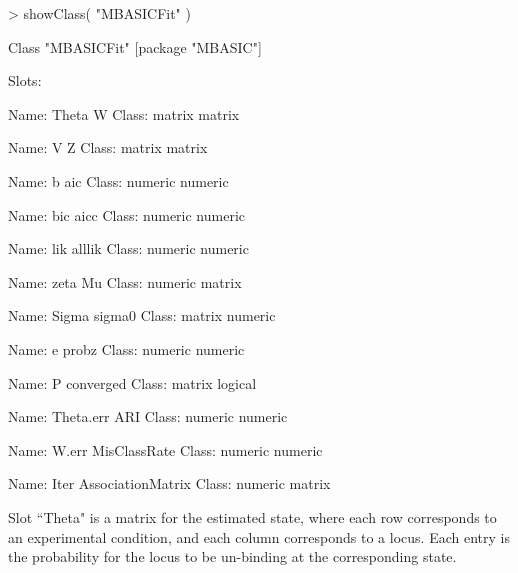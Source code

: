 \documentclass[a4paper,10pt]{article}
\begin{document}
\begin{Schunk}
\begin{Sinput}
> showClass( "MBASICFit" )
\end{Sinput}
\begin{Soutput}
Class "MBASICFit" [package "MBASIC"]

Slots:
                                          
Name:              Theta                 W
Class:            matrix            matrix
                                          
Name:                  V                 Z
Class:            matrix            matrix
                                          
Name:                  b               aic
Class:           numeric           numeric
                                          
Name:                bic              aicc
Class:           numeric           numeric
                                          
Name:                lik            alllik
Class:           numeric           numeric
                                          
Name:               zeta                Mu
Class:           numeric            matrix
                                          
Name:              Sigma            sigma0
Class:            matrix           numeric
                                          
Name:                  e             probz
Class:           numeric           numeric
                                          
Name:                  P         converged
Class:            matrix           logical
                                          
Name:          Theta.err               ARI
Class:           numeric           numeric
                                          
Name:              W.err      MisClassRate
Class:           numeric           numeric
                                          
Name:               Iter AssociationMatrix
Class:           numeric            matrix
\end{Soutput}
\end{Schunk}

Slot ``Theta" is a matrix for the estimated state, where each row corresponds to an experimental condition, and each column corresponds to a locus. Each entry is the probability for the locus to be un-binding at the corresponding state.
\end{document}
